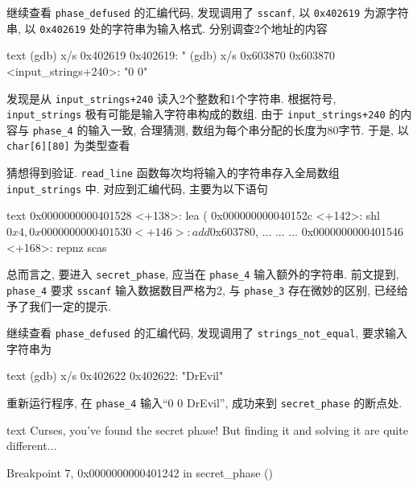 继续查看 \verb|phase_defused| 的汇编代码, 发现调用了 \verb|sscanf|, 以 \verb|0x402619| 为源字符串, 以 \verb|0x402619| 处的字符串为输入格式. 分别调查2个地址的内容
\begin{code}{text}
(gdb) x/s 0x402619
0x402619:       "%
(gdb) x/s 0x603870
0x603870 <input_strings+240>:   "0 0"
\end{code}
发现是从 \verb|input_strings+240| 读入2个整数和1个字符串. 根据符号, \verb|input_strings| 极有可能是输入字符串构成的数组. 由于 \verb|input_strings+240| 的内容与 \verb|phase_4| 的输入一致, 合理猜测, 数组为每个串分配的长度为80字节. 于是, 以 \verb|char[6][80]| 为类型查看
猜想得到验证. \verb|read_line| 函数每次均将输入的字符串存入全局数组 \verb|input_strings| 中. 对应到汇编代码, 主要为以下语句
\begin{code}{text}
    0x0000000000401528 <+138>:   lea    (%
    0x000000000040152c <+142>:   shl    $0x4,%
    0x0000000000401530 <+146>:   add    $0x603780,%
    ...                          ...    ...
    0x0000000000401546 <+168>:   repnz scas %
\end{code}

总而言之, 要进入 \verb|secret_phase|, 应当在 \verb|phase_4| 输入额外的字符串. 前文提到, \verb|phase_4| 要求 \verb|sscanf| 输入数据数目严格为2, 与 \verb|phase_3| 存在微妙的区别, 已经给予了我们一定的提示.

继续查看 \verb|phase_defused| 的汇编代码, 发现调用了 \verb|strings_not_equal|, 要求输入字符串为
\begin{code}{text}
(gdb) x/s 0x402622
0x402622:       "DrEvil"
\end{code}
重新运行程序, 在 \verb|phase_4| 输入“0 0 DrEvil”, 成功来到 \verb|secret_phase| 的断点处.

\begin{code}{text}
Curses, you've found the secret phase!
But finding it and solving it are quite different...

Breakpoint 7, 0x0000000000401242 in secret_phase ()
\end{code}

